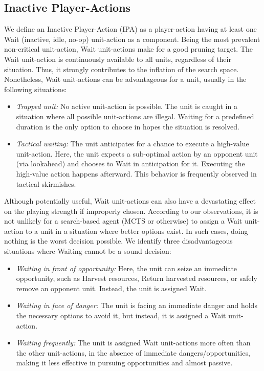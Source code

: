 \documentclass[conference]{IEEEtran}
\begin{document}

\subsection{Inactive Player-Actions}

We define an Inactive Player-Action (IPA) as a player-action having at least one Wait (inactive, idle, no-op) unit-action as a component. Being the most prevalent non-critical unit-action, Wait unit-actions make for a good pruning target. The Wait unit-action is continuously available to all units, regardless of their situation. Thus, it strongly contributes to the inflation of the search space. Nonetheless, Wait unit-actions can be advantageous for a unit, usually in the following situations:

\begin{itemize}
\item \textit{Trapped unit:} No active unit-action is possible. The unit is caught in a situation where all possible unit-actions are illegal. Waiting for a predefined duration is the only option to choose in hopes the situation is resolved.
\item \textit{Tactical waiting:} The unit anticipates for a chance to execute a high-value unit-action. Here, the unit expects a sub-optimal action by an opponent unit (via lookahead) and chooses to Wait in anticipation for it. Executing the high-value action happens afterward. This behavior is frequently observed in tactical skirmishes.
\end{itemize}

Although potentially useful, Wait unit-actions can also have a devastating effect on the playing strength if improperly chosen. According to our observations, it is not unlikely for a search-based agent (MCTS or otherwise) to assign a Wait unit-action to a unit in a situation where better options exist. In such cases, doing nothing is the worst decision possible. We identify three disadvantageous situations where Waiting cannot be a sound decision:

\begin{itemize}
\item \textit{Waiting in front of opportunity:} Here, the unit can seize an immediate opportunity, such as Harvest resources, Return harvested resources, or safely remove an opponent unit. Instead, the unit is assigned Wait.
\item \textit{Waiting in face of danger:} The unit is facing an immediate danger and holds the necessary options to avoid it, but instead, it is assigned a Wait unit-action.
\item \textit{Waiting frequently:} The unit is assigned Wait unit-actions more often than the other unit-actions, in the absence of immediate dangers/opportunities, making it less effective in pursuing opportunities and almost passive.
\end{itemize}
\end{document}
